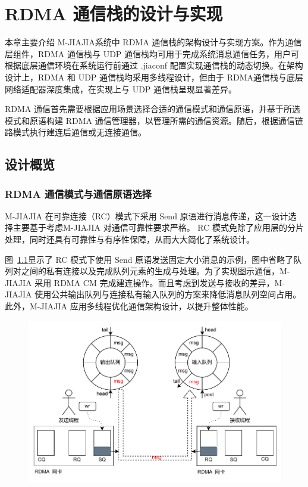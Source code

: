 \chapter{RDMA 通信栈的设计与实现}\label{chap:RDMA}{
    本章主要介绍 M-JIAJIA系统中 RDMA 通信栈的架构设计与实现方案。作为通信层组件，RDMA 通信栈与 UDP 通信栈均可用于完成系统消息通信任务，用户可根据底层通信环境在系统运行前通过 .jiaconf 配置实现通信栈的动态切换。在架构设计上，RDMA 和 UDP 通信栈均采用多线程设计，但由于 RDMA通信栈与底层网络适配器深度集成，在实现上与 UDP 通信栈呈现显著差异。

    RDMA 通信首先需要根据应用场景选择合适的通信模式和通信原语，并基于所选模式和原语构建 RDMA 通信管理器，以管理所需的通信资源。随后，根据通信链路模式执行建连后通信或无连接通信。

    \section{设计概览}\label{sec:RDMA设计概览}

    \subsection{RDMA 通信模式与通信原语选择}

    M-JIAJIA 在可靠连接（RC）模式下采用 Send 原语进行消息传递，这一设计选择主要基于考虑M-JIAJIA 对通信可靠性要求严格。
    RC 模式免除了应用层的分片处理，同时还具有可靠性与有序性保障，从而大大简化了系统设计。

    图~\ref{fig:mjiajia-send-recv}显示了 RC 模式下使用 Send 原语发送固定大小消息的示例，图中省略了队列对之间的私有连接以及完成队列元素的生成与处理。为了实现图示通信，M-JIAJIA 采用 RDMA CM 完成建连操作。而且考虑到发送与接收的差异，M-JIAJIA 使用公共输出队列与连接私有输入队列的方案来降低消息队列空间占用。此外，M-JIAJIA 应用多线程优化通信架构设计，以提升整体性能。
    \begin{figure}[H]
        \centering
        \includegraphics[width=\textwidth]{Img/RDMA通信栈可靠链接.drawio.pdf}
        \label{fig:mjiajia-send-recv}
    \end{figure}



}
